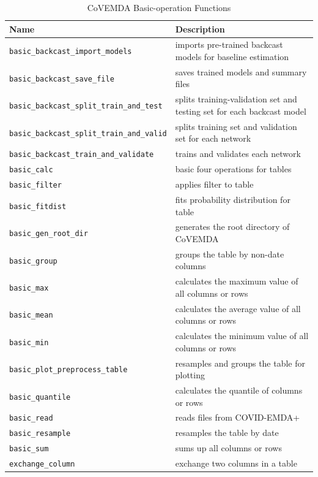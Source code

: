 \documentclass[10pt]{article}
\newcommand{\covemda}{CoVEMDA}
\numberwithin{equation}{section}
\numberwithin{table}{section}
\numberwithin{figure}{section}
\begin{document}
\begin{appendices}
\begin{table}[!ht]
    \centering
    \begin{threeparttable}
    \caption{\covemda{} Basic-operation Functions}
    \label{tab:basic_op_func}
    \footnotesize
    \begin{tabular}{ll}
        \toprule
        Name & Description \\
        \midrule
        \verb!basic_backcast_import_models! & imports pre-trained backcast models for baseline estimation \\
        \verb!basic_backcast_save_file! & saves trained models and summary files \\
        \verb!basic_backcast_split_train_and_test! & splits training-validation set and testing set for each backcast model \\
        \verb!basic_backcast_split_train_and_valid! & splits training set and validation set for each network \\
        \verb!basic_backcast_train_and_validate! & trains and validates each network \\
        \verb!basic_calc! & basic four operations for tables \\
        \verb!basic_filter! & applies filter to table \\
        \verb!basic_fitdist! & fits probability distribution for table \\
        \verb!basic_gen_root_dir! & generates the root directory of \covemda{} \\
        \verb!basic_group! & groups the table by non-date columns \\
        \verb!basic_max! & calculates the maximum value of all columns or rows \\
        \verb!basic_mean! & calculates the average value of all columns or rows \\
        \verb!basic_min! & calculates the minimum value of all columns or rows \\
        \verb!basic_plot_preprocess_table! & resamples and groups the table for plotting \\
        \verb!basic_quantile! & calculates the quantile of columns or rows \\
        \verb!basic_read! & reads files from COVID-EMDA+ \\
        \verb!basic_resample! & resamples the table by date \\
        \verb!basic_sum! & sums up all columns or rows \\
        \verb!exchange_column! & exchange two columns in a table\\
        \bottomrule
    \end{tabular}
    \end{threeparttable}
\end{table}

\end{appendices}




\newpage
\label{sec:ref}

\nocite{rubin2003basic}
\nocite{deeplearninguser}
\nocite{statisticsuser}


\end{document}
